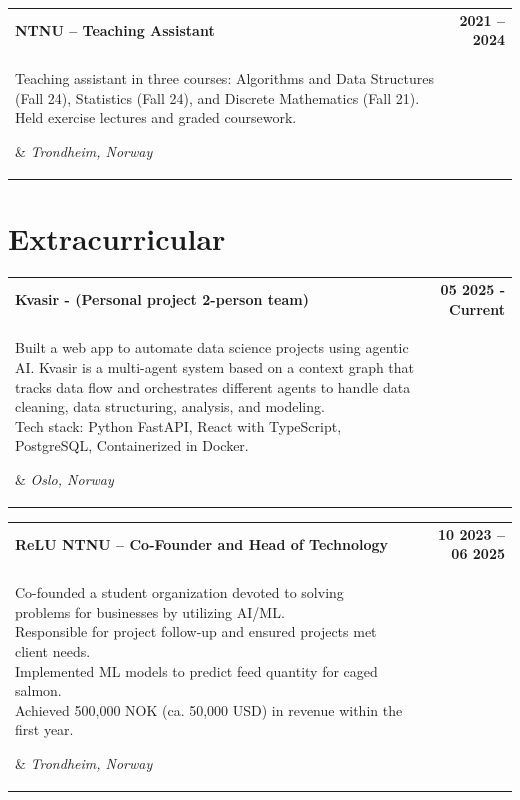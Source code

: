 \documentclass[letterpaper,11pt]{article}
\makeatletter
\newcommand{\resumeSubheadingTwo}[4]{
  \vspace{-2pt}
  \renewcommand{\arraystretch}{1}
    \begin{tabular*}{1.0\textwidth}[t]{p{0.8\textwidth}@{\extracolsep{\fill}}r}
      \textbf{\small#1} & \textbf{\small #2}\\
        \parbox[t]{0.8\textwidth}{
        \setlength{\hangindent}{1em}
        \hspace{1em}\small#3} & \textit{\small #4} \\
    \end{tabular*}\vspace{5pt}
}
\makeatother
\begin{document}
    
    
    \resumeSubheadingTwo{NTNU -- Teaching Assistant}{2021 -- 2024}{Teaching assistant in three courses: Algorithms and Data Structures (Fall 24), Statistics (Fall 24), and Discrete Mathematics (Fall 21). Held exercise lectures and graded coursework.}{Trondheim, Norway}
    \vspace{-10pt}
    

\section{Extracurricular}
    \resumeSubheadingTwo{Kvasir - (Personal project 2-person team)}{05 2025 - Current}{Built a web app to automate data science projects using agentic AI. Kvasir is a multi-agent system based on a context graph that tracks data flow and orchestrates different agents to handle data cleaning, data structuring, analysis, and modeling.\\
    Tech stack: Python FastAPI, React with TypeScript, PostgreSQL, Containerized in Docker.}{Oslo, Norway}
    \vspace{-3pt}
    
    \resumeSubheadingTwo{ReLU NTNU -- Co-Founder and Head of Technology}{10 2023 -- 06 2025}{Co-founded a student organization devoted to solving problems for businesses by utilizing AI/ML. \\ Responsible for project follow-up and ensured projects met client needs.\\Implemented ML models to predict feed quantity for caged salmon. \\ Achieved 500,000 NOK (ca. 50,000 USD) in revenue within the first year.}{Trondheim, Norway}
    \vspace{-10pt}
\end{document}
